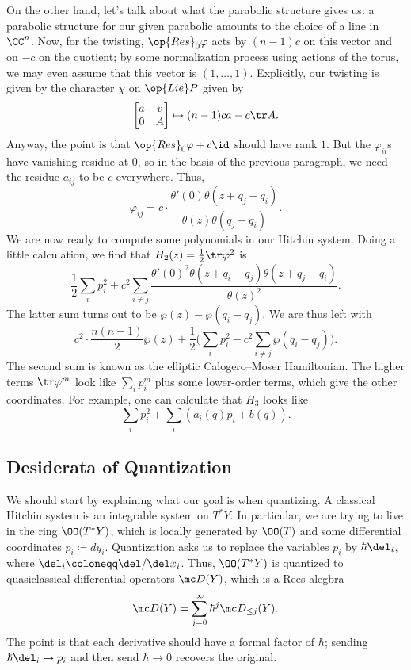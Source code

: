\documentclass[../notes.tex]{subfiles}
\begin{document}
On the other hand, let's talk about what the parabolic structure gives us: a parabolic structure for our given parabolic amounts to the choice of a line in $\CC^n$. Now, for the twisting, $\op{Res}_0\varphi$ acts by $(n-1)c$ on this vector and on $-c$ on the quotient; by some normalization process using actions of the torus, we may even assume that this vector is $(1,\ldots,1)$. Explicitly, our twisting is given by the character $\chi$ on $\op{Lie}P$ given by
\[\begin{bmatrix}
	a & v \\
	0 & A
\end{bmatrix}\mapsto(n-1)ca-c\tr A.\]
Anyway, the point is that $\op{Res}_0\varphi+c\id$ should have rank $1$. But the $\varphi_{ii}$s have vanishing residue at $0$, so in the basis of the previous paragraph, we need the residue $a_{ij}$ to be $c$ everywhere. Thus,
\[\varphi_{ij}=c\cdot\frac{\theta'(0)\theta(z+q_j-q_i)}{\theta(z)\theta(q_j-q_i)}.\]
We are now ready to compute some polynomials in our Hitchin system. Doing a little calculation, we find that $H_2(z)=\frac12\tr\varphi^2$ is
\[\frac12\sum_ip_i^2+c^2\sum_{i\ne j}\frac{\theta'(0)^2\theta(z+q_i-q_j)\theta(z+q_j-q_i)}{\theta(z)^2}.\]
The latter sum turns out to be $\wp(z)-\wp(q_i-q_j)$. We are thus left with
\[c^2\cdot\frac{n(n-1)}2\wp(z)+\frac12\Bigg(\sum_ip_i^2-c^2\sum_{i\ne j}\wp(q_i-q_j)\Bigg).\]
The second sum is known as the elliptic Calogero--Moser Hamiltonian. The higher terms $\tr\varphi^m$ look like $\sum_ip_i^m$ plus some lower-order terms, which give the other coordinates. For example, one can calculate that $H_3$ looks like
\[\sum_ip_i^2+\sum_i(a_i(q)p_i+b(q)).\]

\subsection{Desiderata of Quantization}
We should start by explaining what our goal is when quantizing. A classical Hitchin system is an integrable system on $T^*Y$. In particular, we are trying to live in the ring $\OO(T^*Y)$, which is locally generated by $\OO(T)$ and some differential coordinates $p_i\coloneqq dy_i$. Quantization asks us to replace the variables $p_i$ by $\hbar\del_i$, where $\del_i\coloneqq\del/\del x_i$. Thus, $\OO(T^*Y)$ is quantized to quasiclassical differential operators $\mc D(Y)$, which is a Rees alegbra
\[\mc D(Y)=\sum_{j=0}^\infty\hbar^j\mc D_{\le j}(Y).\]
The point is that each derivative should have a formal factor of $\hbar$; sending $\hbar\del_i\to p_i$ and then send $\hbar\to0$ recovers the original.
\end{document}
